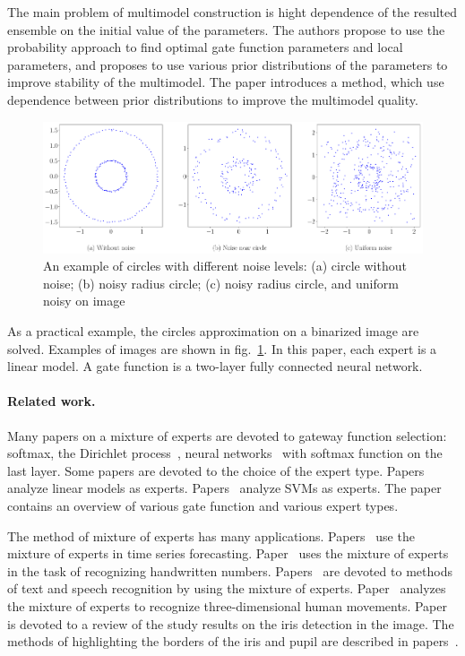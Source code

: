 \documentclass[12pt, twoside]{article}
\numberwithin{equation}{section}
\begin{document}
The main problem of multimodel construction is hight dependence of the resulted ensemble on the initial value of the parameters.
The authors propose to use the probability approach to find optimal gate function parameters and local parameters, and proposes to use various prior distributions of the parameters to improve stability of the multimodel.
The paper introduces a method, which use dependence between prior distributions to improve the multimodel quality.

\begin{figure}[h!t]\center
\includegraphics[width=1\textwidth]{result_eng/statment}
\caption{An example of circles with different noise levels: (a) circle without noise; (b) noisy radius circle; (c) noisy radius circle, and uniform noisy on image}
\label{example:1}
\end{figure}

As a practical example, the circles approximation on a binarized image are solved.
Examples of images are shown in fig.~\ref{example:1}.
In this paper, each expert is a linear model.
A gate function is a two-layer fully connected neural network.

\paragraph{Related work.}
Many papers on a mixture of experts are devoted to gateway function selection: softmax, the Dirichlet process~\cite{Edward2002}, neural networks~\cite{Shazeer2017} with softmax function on the last layer.
Some papers are devoted to the choice of the expert type. 
Papers~\cite{Jordan1994, Jordan1991} analyze linear models as experts.
Papers~\cite{Lima2007, Cao2003} analyze SVMs as experts.
The paper~\cite{Yuksel2012} contains an overview of various gate function and various expert types.

The method of mixture of experts has many applications.
Papers~\cite{Yumlu2003, Cheung1995, Weigend2000} use the mixture of experts in time series forecasting.
Paper~\cite{Ebrahimpour2009} uses the mixture of experts in the task of recognizing handwritten numbers.
Papers~\cite{Estabrooks2001, Mossavat2010, Peng1996, Tuerk2001}  are devoted to methods of text and speech recognition by using the mixture of experts.
Paper~\cite{Sminchisescu2007} analyzes the mixture of experts to recognize three-dimensional human movements.
Paper~\cite{Bowyer2010} is devoted to a review of the study results on the iris detection in the image.
The methods of highlighting the borders of the iris and pupil are described in papers~\cite{Matveev2010, Matveev2014}.
\end{document}

